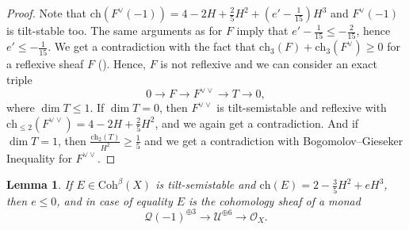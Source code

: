 \documentclass{amsart}
\newtheorem{lemma}[theorem]{Lemma}
\begin{document}
\begin{proof}
		Note that $\mathrm{ch}(F^\vee(-1))=4-2H+\frac 25H^2+(e'-\frac{1}{15})H^3$ and $F^\vee(-1)$ is tilt-stable too. 
		The same arguments as for $F$ imply that $e'-\frac{1}{15}\le-\frac{2}{15}$, hence $e'\le-\frac{1}{15}$. We get a contradiction with the fact that $\mathrm{ch}_3(F)+\mathrm{ch}_3(F^\vee)\ge 0$ for a reflexive sheaf $F$ (\cite[Lemma 2.17]{Vass}). Hence, $F$ is not reflexive and we can consider an exact triple
		$$0\to F\to F^{\vee\vee}\to T\to 0,$$
		where $\dim T\le 1$. If $\dim T=0$, then $F^{\vee\vee}$ is tilt-semistable and reflexive with $\mathrm{ch}_{\le 2}(F^{\vee\vee})=4-2H+\frac 25H^2$, and we again get a contradiction. And if $\dim T=1$, then $\frac{\mathrm{ch}_2(T)}{H^2}\ge\frac 15$ and we get a contradiction with Bogomolov--Gieseker Inequality for $F^{\vee\vee}$.
	\end{proof}
	
	\begin{lemma}\label{2 0 -3/5} If $E\in\mathrm{Coh}^\beta(X)$ is tilt-semistable and $\mathrm{ch}(E)=2-\frac 35H^2+eH^3$, then $e\le 0$, and in case of equality $E$ is the cohomology sheaf of a monad
		\begin{equation}\label{3-term}
			\mathcal Q(-1)^{\oplus 3}\to\mathcal U^{\oplus 6}\to\mathcal O_X.
		\end{equation}
	\end{lemma}
	
\end{document}
